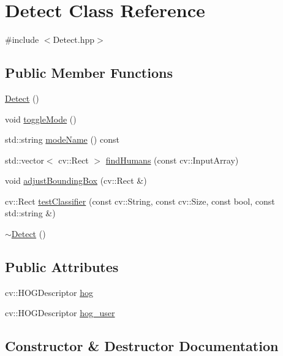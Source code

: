 \hypertarget{classDetect}{}\section{Detect Class Reference}
\label{classDetect}


{\ttfamily \#include $<$Detect.\+hpp$>$}

\subsection*{Public Member Functions}
\begin{DoxyCompactItemize}
\item 
\hyperlink{classDetect_afefa427dddf8e308f93fd49424cc3680}{Detect} ()
\item 
void \hyperlink{classDetect_a75d4c27eb616460a8ba5a387620626e6}{toggle\+Mode} ()
\item 
std\+::string \hyperlink{classDetect_a0742e945747fa012fb22d957a459978c}{mode\+Name} () const 
\item 
std\+::vector$<$ cv\+::\+Rect $>$ \hyperlink{classDetect_a1d25bc00785e30f42c1f6211d11786d0}{find\+Humans} (const cv\+::\+Input\+Array)
\item 
void \hyperlink{classDetect_a9b8ebb6ab8c9a07febbba30c03f55fce}{adjust\+Bounding\+Box} (cv\+::\+Rect \&)
\item 
cv\+::\+Rect \hyperlink{classDetect_aa04e736f215a89c0cd164e0465bf9f44}{test\+Classifier} (const cv\+::\+String, const cv\+::\+Size, const bool, const std\+::string \&)
\item 
\hyperlink{classDetect_aa808b1146b9b8db316b25b02f0a6b5f3}{$\sim$\+Detect} ()
\end{DoxyCompactItemize}
\subsection*{Public Attributes}
\begin{DoxyCompactItemize}
\item 
cv\+::\+H\+O\+G\+Descriptor \hyperlink{classDetect_ab7b1c5cfa3e8f5daa91f2fe644327005}{hog}
\item 
cv\+::\+H\+O\+G\+Descriptor \hyperlink{classDetect_ad7d55a57eca5ee84b37c1ea00489f770}{hog\+\_\+user}
\end{DoxyCompactItemize}


\subsection{Constructor \& Destructor Documentation}
